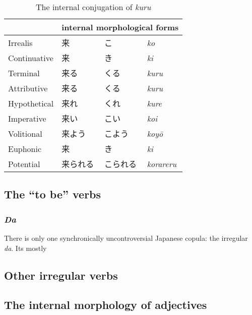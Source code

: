\documentclass[UTF8, a4paper, oneside, scheme=plain]{ctexrep}
\newcommand{\corpus}[1]{\emph{#1}}
\begin{document}
\begin{table}[H]
\caption{The internal conjugation of \corpus{kuru}}
\label{tbl:kuru-table}
\centering
\begin{tabular}{llll}
\toprule
                & \multicolumn{3}{l}{internal morphological forms} \\ \midrule
Irrealis     & 来             & こ               & \corpus{ko}               \\
Continuative & 来             & き               & \corpus{ki}               \\
Terminal     & 来る            & くる            & \corpus{kuru}             \\
Attributive  & 来る            & くる            & \corpus{kuru}             \\
Hypothetical & 来れ            & くれ            & \corpus{kure}             \\
Imperative   & 来い            & こい            & \corpus{koi}              \\
Volitional   & 来よう           & こよう         & \corpus{koyō}             \\
Euphonic     & 来             & き              & \corpus{ki}               \\
Potential    & 来られる          & こられる      & \corpus{korareru}        \\ 
\bottomrule
\end{tabular}
\end{table}

\subsection{The ``to be'' verbs}

\subsubsection{\corpus{Da}}\label{sec:copula-da}

There is only one synchronically uncontroversial Japanese copula:
the irregular \corpus{da}.
Its mostly 

\subsection{Other irregular verbs}

\subsection{The internal morphology of adjectives}\label{sec:adjective-internal-form}
\end{document}
